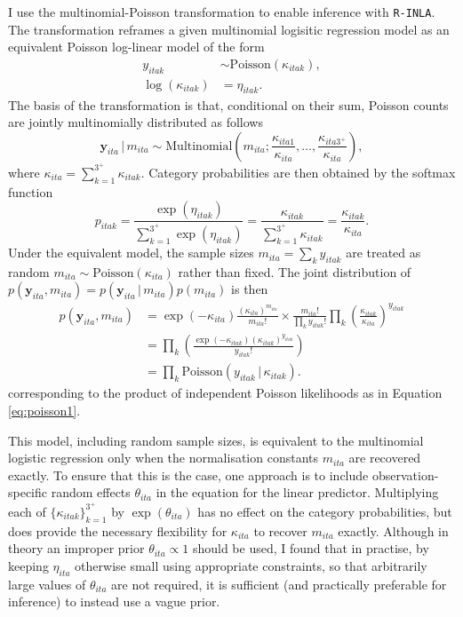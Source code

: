 \documentclass[a4paper, nobind]{templates/ociamthesis}
\begin{document}
I use the multinomial-Poisson transformation to enable inference with \texttt{R-INLA}.
The transformation reframes a given multinomial logisitic regression model as an equivalent Poisson log-linear model of the form
\begin{align}
    y_{itak} &\sim \text{Poisson}(\kappa_{itak}), \label{eq:poisson1} \\
    \log(\kappa_{itak}) &= \eta_{itak}. \label{eq:poisson2}
\end{align}
The basis of the transformation is that, conditional on their sum, Poisson counts are jointly multinomially distributed \autocite{mccullagh1989generalized} as follows
\begin{equation}
    \mathbf{y}_{ita} \, | \, m_{ita} \sim \text{Multinomial} \left( m_{ita}; \frac{\kappa_{ita1}}{\kappa_{ita}}, \ldots, \frac{\kappa_{ita3^{+}}}{\kappa_{ita}} \right),
\end{equation}
where \(\kappa_{ita} = \sum_{k = 1}^{3^{+}} \kappa_{itak}\).
Category probabilities are then obtained by the softmax function
\begin{equation}
    p_{itak} = \frac{\exp(\eta_{itak})}{\sum_{k = 1}^{3^{+}} \exp(\eta_{itak})} = \frac{\kappa_{itak}}{\sum_{k = 1}^{3^{+}} \kappa_{itak}} = \frac{\kappa_{itak}}{\kappa_{ita}}.
\end{equation}
Under the equivalent model, the sample sizes \(m_{ita} = \sum_k y_{itak}\) are treated as random \(m_{ita} \sim \text{Poisson} \left( \kappa_{ita} \right)\) rather than fixed.
The joint distribution of \(p(\mathbf{y}_{ita}, m_{ita}) = p(\mathbf{y}_{ita} \, | \, m_{ita})p(m_{ita})\) is then
\begin{align}
p(\mathbf{y}_{ita}, m_{ita}) &= \exp(-\kappa_{ita}) \frac{(\kappa_{ita})^{m_{ita}}}{m_{ita}!} \times \frac{m_{ita}!}{\prod_k y_{itak}!} \prod_k \left( \frac{\kappa_{itak}}{\kappa_{ita}} \right)^{y_{itak}} \\
&= \prod_k \left( \frac{\exp(-\kappa_{itak}) \left( \kappa_{itak} \right)^{y_{itak}}}{y_{itak}!} \right) \\
&= \prod_k \text{Poisson} \left( y_{itak} \, | \, \kappa_{itak} \right). \label{eq:prodpoisson}
\end{align}
corresponding to the product of independent Poisson likelihoods as in Equation \eqref{eq:poisson1}.

This model, including random sample sizes, is equivalent to the multinomial logistic regression only when the normalisation constants \(m_{ita}\) are recovered exactly.
To ensure that this is the case, one approach is to include observation-specific random effects \(\theta_{ita}\) in the equation for the linear predictor.
Multiplying each of \(\{\kappa_{itak}\}_{k = 1}^{3^+}\) by \(\exp(\theta_{ita})\) has no effect on the category probabilities, but does provide the necessary flexibility for \(\kappa_{ita}\) to recover \(m_{ita}\) exactly.
Although in theory an improper prior \(\theta_{ita} \propto 1\) should be used, I found that in practise, by keeping \(\eta_{ita}\) otherwise small using appropriate constraints, so that arbitrarily large values of \(\theta_{ita}\) are not required, it is sufficient (and practically preferable for inference) to instead use a vague prior.
\end{document}
